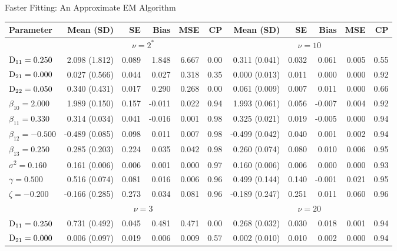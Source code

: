 \begin{chapter}{\label{cha:approx}Faster Fitting: An Approximate EM Algorithm}
  \begin{table}[t]
  \raggedleft
  \captionsetup{font=scriptsize}
  \scriptsize
  \begin{tabular}{l|rrrrr:rrrrr}
    Parameter & Mean (SD) & SE & Bias & MSE & CP & Mean (SD) & SE & Bias & MSE & CP \\ 
    \hline
    &  &  \\ 
    \hline
    $\mathrm{D}_{11} = 0.250$ &  2.098 (1.812) & 0.089 &  1.848 & 6.667 & 0.00 &  0.311 (0.041) & 0.032 &  0.061 & 0.005 & 0.55 \\ 
    $\mathrm{D}_{21} = 0.000$ &  0.027 (0.566) & 0.044 &  0.027 & 0.318 & 0.35 &  0.000 (0.013) & 0.011 &  0.000 & 0.000 & 0.92 \\ 
    $\mathrm{D}_{22} = 0.050$ &  0.340 (0.431) & 0.017 &  0.290 & 0.268 & 0.00 &  0.061 (0.009) & 0.007 &  0.011 & 0.000 & 0.66 \\ 
    $\beta_{10} = 2.000$ &  1.989 (0.150) & 0.157 & -0.011 & 0.022 & 0.94 &  1.993 (0.061) & 0.056 & -0.007 & 0.004 & 0.92 \\ 
    $\beta_{11} = 0.330$ &  0.314 (0.034) & 0.041 & -0.016 & 0.001 & 0.98 &  0.325 (0.021) & 0.019 & -0.005 & 0.000 & 0.94 \\ 
    $\beta_{12} = -0.500$ & -0.489 (0.085) & 0.098 &  0.011 & 0.007 & 0.98 & -0.499 (0.042) & 0.040 &  0.001 & 0.002 & 0.94 \\ 
    $\beta_{13} = 0.250$ &  0.285 (0.203) & 0.224 &  0.035 & 0.042 & 0.98 &  0.260 (0.074) & 0.080 &  0.010 & 0.006 & 0.95 \\ 
    $\sigma^2 = 0.160$ &  0.161 (0.006) & 0.006 &  0.001 & 0.000 & 0.97 &  0.160 (0.006) & 0.006 &  0.000 & 0.000 & 0.93 \\ 
    $\gamma = 0.500$ &  0.516 (0.074) & 0.081 &  0.016 & 0.006 & 0.96 &  0.499 (0.144) & 0.140 & -0.001 & 0.021 & 0.95 \\ 
    $\zeta = -0.200$ & -0.166 (0.285) & 0.273 &  0.034 & 0.081 & 0.96 & -0.189 (0.247) & 0.251 &  0.011 & 0.060 & 0.96 \\ 
    \hline
     &  &  \\ 
    \hline
    $\mathrm{D}_{11} = 0.250$ &  0.731 (0.492) & 0.045 &  0.481 & 0.471 & 0.00 &  0.268 (0.032) & 0.030 &  0.018 & 0.001 & 0.94 \\ 
    $\mathrm{D}_{21} = 0.000$ &  0.006 (0.097) & 0.019 &  0.006 & 0.009 & 0.57 &  0.002 (0.010) & 0.010 &  0.002 & 0.000 & 0.94 \\ 

\end{tabular}
\end{table}
\end{chapter}
